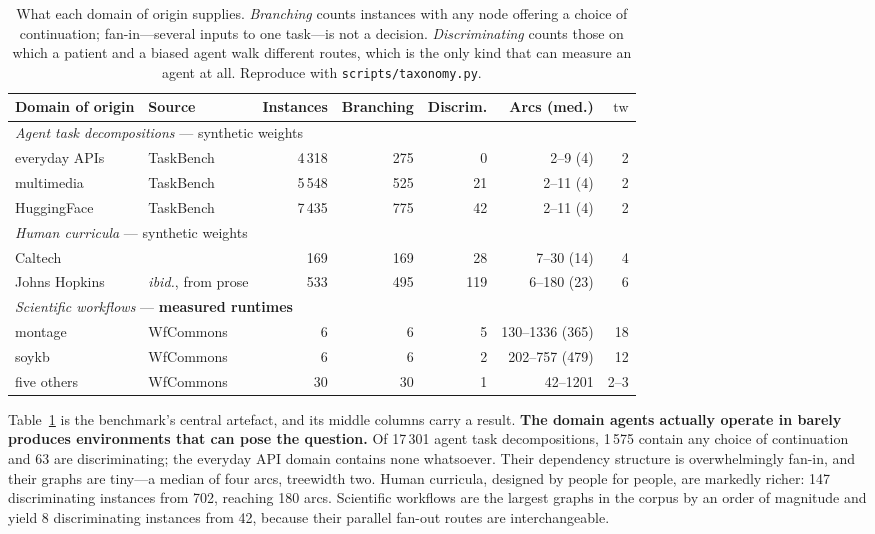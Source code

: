 \documentclass[10pt]{article}
\newcommand{\tw}{\mathrm{tw}}
\begin{document}
\begin{table}[t]
\centering
\small
\begin{tabular}{llrrrrr}
\toprule
Domain of origin & Source & Instances & Branching & Discrim. & Arcs (med.) & $\tw$ \\
\midrule
\multicolumn{7}{l}{\emph{Agent task decompositions} --- synthetic weights} \\
\quad everyday APIs   & TaskBench~\cite{taskbench} & 4\,318 &   275 &   0 & 2--9 (4)     & 2 \\
\quad multimedia      & TaskBench                  & 5\,548 &   525 &  21 & 2--11 (4)    & 2 \\
\quad HuggingFace     & TaskBench                  & 7\,435 &   775 &  42 & 2--11 (4)    & 2 \\
\midrule
\multicolumn{7}{l}{\emph{Human curricula} --- synthetic weights} \\
\quad Caltech         & \cite{stavrinides2023}     &   169 &   169 &  28 & 7--30 (14)   & 4 \\
\quad Johns Hopkins   & \emph{ibid.}, from prose   &   533 &   495 & 119 & 6--180 (23)  & 6 \\
\midrule
\multicolumn{7}{l}{\emph{Scientific workflows} --- \textbf{measured runtimes}} \\
\quad montage         & WfCommons~\cite{wfcommons} &     6 &     6 &   5 & 130--1336 (365) & 18 \\
\quad soykb           & WfCommons                  &     6 &     6 &   2 & 202--757 (479)  & 12 \\
\quad five others     & WfCommons                  &    30 &    30 &   1 & 42--1201        & 2--3 \\
\bottomrule
\end{tabular}
\caption{What each domain of origin supplies. \emph{Branching} counts instances
with any node offering a choice of continuation; fan-in---several inputs to one
task---is not a decision. \emph{Discriminating} counts those on which a patient and
a biased agent walk different routes, which is the only kind that can measure an
agent at all. Reproduce with \texttt{scripts/taxonomy.py}.}
\label{tab:corpus}
\end{table}

Table~\ref{tab:corpus} is the benchmark's central artefact, and its middle columns
carry a result. \textbf{The domain agents actually operate in barely produces
environments that can pose the question.} Of 17\,301 agent task decompositions,
1\,575 contain any choice of continuation and 63 are discriminating; the everyday
API domain contains none whatsoever. Their dependency structure is overwhelmingly
fan-in, and their graphs are tiny---a median of four arcs, treewidth two. Human
curricula, designed by people for people, are markedly richer: 147 discriminating
instances from 702, reaching 180 arcs. Scientific workflows are the largest graphs
in the corpus by an order of magnitude and yield 8 discriminating instances from 42,
because their parallel fan-out routes are interchangeable.
\end{document}
